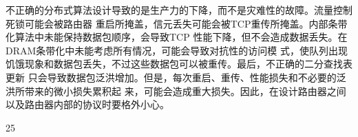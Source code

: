 不正确的分布式算法设计导致的是生产力的下降，而不是灾难性的故障。流量控制死锁可能会被路由器
重启所掩盖，信元丢失可能会被TCP重传所掩盖。内部条带化算法中未能保持数据包顺序，会导致TCP
性能下降，但不会造成数据丢失。在DRAM条带化中未能考虑所有情况，可能会导致对抗性的访问模
式，使队列出现饥饿现象和数据包丢失，不过这些数据包可以被重传。最后，不正确的二分查找表更新
只会导致数据包泛洪增加。但是，每次重启、重传、性能损失和不必要的泛洪所带来的微小损失累积起
来，可能会造成重大损失。因此，在设计路由器之间以及路由器内部的协议时要格外小心。




                                              25
